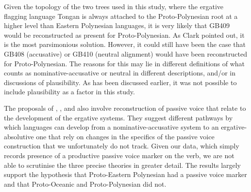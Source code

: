 \documentclass[a4paper,10pt]{article} %
\begin{document}
Given the topology of the two trees used in this study, where the ergative flagging language Tongan is always attached to the Proto-Polynesian root at a higher level than Eastern Polynesian languages, it is very likely that GB409 would be reconstructed as present for Proto-Polynesian. As Clark pointed out, it is the most parsimonious solution. However, it could still have been the case that GB408 (accusative) or GB410 (neutral alignment) would have been reconstructed for Proto-Polynesian. The reasons for this may lie in different definitions of what counts as nominative-accusative or neutral in different descriptions, and/or in discussions of plausibility. As has been discussed earlier, it was not possible to include plausibility as a factor in this study.

The proposals of \citet{hale_1968}, \citet{hohepa_1967, hohepa_1969}, and \citet{chung1978} also involve reconstruction of passive voice that relate to the development of the ergative systems. They suggest different pathways by which languages can develop from a nominative-accusative system to an ergative-absolutive one that rely on changes in the specifics of the passive voice construction that we unfortunately do not track. Given our data, which simply records presence of a productive passive voice marker on the verb, we are not able to scrutinise the three precise theories in greater detail. The results largely support the hypothesis that Proto-Eastern Polynesian had a passive voice marker and that Proto-Oceanic and Proto-Polynesian did not. %


\end{document}
